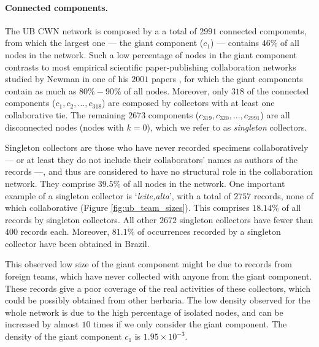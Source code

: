 \paragraph*{Connected components.}
The UB CWN network is composed by a a total of $2991$ connected components, from which the largest one --- the giant component ($c_1$) ---  contains $46\%$ of all nodes in the network.
Such a low percentage of nodes in the giant component contrasts to most empirical scientific paper-publishing collaboration networks studied by Newman in one of his $2001$ papers \cite{Newman2001d}, for which the giant components contain as much as $80\% - 90\%$ of all nodes.
Moreover, only $318$ of the connected components ($c_1, c_2, ..., c_{318}$) are composed by collectors with at least one collaborative tie.
The remaining $2673$ components ($c_{319}, c_{320}, ..., c_{2991}$) are all disconnected nodes (nodes with $k=0$), which we refer to as \textit{singleton} collectors.

Singleton collectors are those who have never recorded specimens collaboratively --- or at least they do not include their collaborators' names as authors of the records ---, and thus are considered to have no structural role in the collaboration network.
They comprise $39.5\%$ of all nodes in the network.
%
One important example of a singleton collector is `\textit{leite,alta}', with a total of $2757$ records, none of which collaborative (Figure \ref{fig:ub_team_sizes}).  %
This comprises $18.14\%$ of all records by singleton collectors.
All other $2672$ singleton collectors have fewer than $400$ records each.
Moreover, $81.1\%$ of occurrences recorded by a singleton collector have been obtained in Brazil.

This observed low size of the giant component might be due to records from foreign teams, which have never collected with anyone from the giant component. 
These records give a poor coverage of the real activities of these collectors, which could be possibly obtained from other herbaria.
%
The low density observed for the whole network is due to the high percentage of isolated nodes, and can be increased by almost $10$ times if we only consider the giant component. 
The density of the giant component $c_1$ is $1.95 \times 10^{-3}$.

